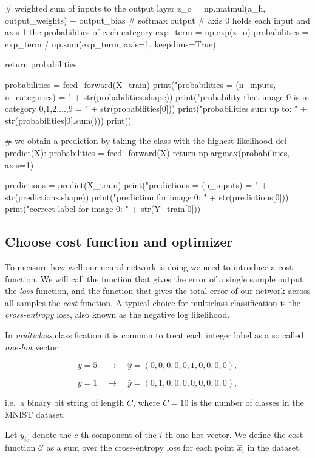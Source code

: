 \documentclass[%
oneside,                 %
final,                   %
10pt]{article}
\begin{document}
    # weighted sum of inputs to the output layer
    z_o = np.matmul(a_h, output_weights) + output_bias
    # softmax output
    # axis 0 holds each input and axis 1 the probabilities of each category
    exp_term = np.exp(z_o)
    probabilities = exp_term / np.sum(exp_term, axis=1, keepdims=True)
    
    return probabilities

probabilities = feed_forward(X_train)
print("probabilities = (n_inputs, n_categories) = " + str(probabilities.shape))
print("probability that image 0 is in category 0,1,2,...,9 = \n" + str(probabilities[0]))
print("probabilities sum up to: " + str(probabilities[0].sum()))
print()

# we obtain a prediction by taking the class with the highest likelihood
def predict(X):
    probabilities = feed_forward(X)
    return np.argmax(probabilities, axis=1)

predictions = predict(X_train)
print("predictions = (n_inputs) = " + str(predictions.shape))
print("prediction for image 0: " + str(predictions[0]))
print("correct label for image 0: " + str(Y_train[0]))
\epycod

\subsection{Choose cost function and optimizer}

To measure how well our neural network is doing we need to introduce a cost function.  
We will call the function that gives the error of a single sample output the \emph{loss} function, and the function
that gives the total error of our network across all samples the \emph{cost} function.
A typical choice for multiclass classification is the \emph{cross-entropy} loss, also known as the negative log likelihood.  

In \emph{multiclass} classification it is common to treat each integer label as a so called \emph{one-hot} vector:  

$$ y = 5 \quad \rightarrow \quad \hat{y} = (0, 0, 0, 0, 0, 1, 0, 0, 0, 0) ,$$  


$$ y = 1 \quad \rightarrow \quad \hat{y} = (0, 1, 0, 0, 0, 0, 0, 0, 0, 0) ,$$  


i.e.~a binary bit string of length $C$, where $C = 10$ is the number of classes in the MNIST dataset.  

Let $y_{ic}$ denote the $c$-th component of the $i$-th one-hot vector.  
We define the cost function $\mathcal{C}$ as a sum over the cross-entropy loss for each point $\hat{x}_i$ in the dataset.
\end{document}
